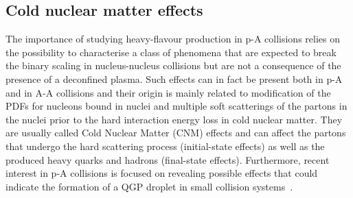 \subsection{Cold nuclear matter effects}
\label{sec:CNM}
The importance of studying heavy-flavour production in p-A collisions relies on the possibility to
characterise a class of phenomena that are expected to break the binary scaling in 
nucleus-nucleus collisions but are not a consequence of the presence of a 
deconfined plasma. Such effects can in fact be present both in p-A and in A-A collisions and
their origin is mainly related to modification of the PDFs for nucleons bound in nuclei and
multiple soft scatterings of the partons in the nuclei prior to the
hard interaction energy loss in cold nuclear matter. 
They are usually called Cold Nuclear Matter (CNM) effects and
can affect the partons that undergo the hard 
scattering process (initial-state effects) as well as
the produced heavy quarks and hadrons (final-state effects).
Furthermore, recent interest in p-A collisions
is focused on revealing possible effects that could indicate the 
formation of a QGP droplet in small collision systems~\cite{Beraudo:2015wsd,Bozek:2014era,Bzdak:2013zma}.

